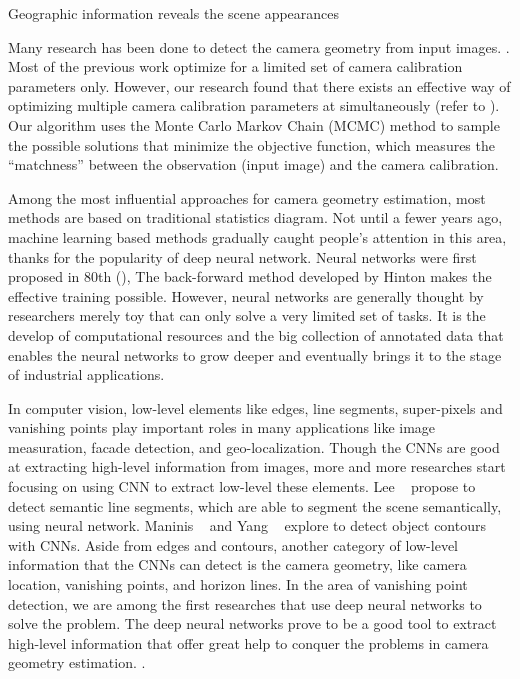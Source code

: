 Geographic
information reveals the scene appearances 

\sepline

Many research has been done to detect the camera
geometry from input images. . Most of the
previous work optimize for a limited set of camera calibration
parameters only. However, our research found that there exists an
effective way of optimizing multiple camera calibration parameters at
simultaneously (refer to ). Our algorithm uses the Monte
Carlo Markov Chain (MCMC) method to sample the possible solutions that
minimize the objective function, which measures the ``matchness''
between the observation (input image) and the camera calibration.

Among the most influential approaches for camera geometry estimation,
most methods are based on traditional statistics diagram. Not until a
fewer years ago, machine learning based methods gradually caught
people's attention in this area, thanks for the popularity of deep
neural network. Neural networks were first proposed in 80th
(), The back-forward method developed by Hinton
 makes the effective training possible. However, neural
networks are generally thought by researchers merely toy that can only
solve a very limited set of tasks. It is the develop of computational
resources and the big collection of annotated data that enables the
neural networks to grow deeper and eventually brings it to the stage of
industrial applications.

In computer vision, low-level elements like edges, line segments,
super-pixels and vanishing points play important roles in many
applications like image measuration, facade detection, and
geo-localization.
Though the CNNs are good at extracting high-level information from
images, more and more researches start focusing on using CNN to
extract low-level these elements.
%
Lee \etal~\cite{lee2017semantic} propose to detect semantic line
segments, which are able to segment the scene semantically, using
neural network. Maninis \etal~\cite{maninis2016convolutional} and Yang
\etal~\cite{yang2016object} explore to detect object contours with
CNNs.
%
Aside from edges and contours, another category of low-level
information that the CNNs can detect is the camera geometry, like
camera location, vanishing points, and horizon lines.
%
In the area of vanishing point detection, we are among the first
researches that use deep neural networks to solve the problem. The
deep neural networks prove to be a good tool to extract high-level
information that offer great help to conquer the problems in camera
geometry estimation. .

